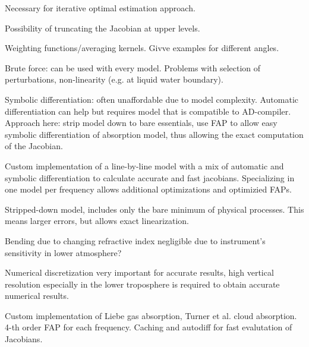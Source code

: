 \stopsection


\startsection[title=Linearization]

    Necessary for iterative optimal estimation approach.

    Possibility of truncating the Jacobian at upper levels.

    \startsubsection[title=Weighting Functions]

        Weighting functions/averaging kernels. Givve examples for different
        angles.

    \stopsubsection

    \startsubsection[title=Calculating the Jacobian]

        Brute force: can be used with every model. Problems with selection of
        perturbations, non-linearity (e.g. at liquid water boundary).

        Symbolic differentiation: often unaffordable due to model complexity.
        Automatic differentiation can help but requires model that is
        compatible to AD-compiler. Approach here: strip model down to bare
        essentials, use FAP to allow easy symbolic differentiation of
        absorption model, thus allowing the exact computation of the Jacobian.
        
    \stopsubsection

\stopsection


\startsection[title=A Numerical Model]

    Custom implementation of a line-by-line model with a mix of automatic and
    symbolic differentiation to calculate accurate and fast jacobians.
    Specializing in one model per frequency allows additional optimizations
    and optimizied FAPs.

    Stripped-down model, includes only the bare minimum of physical processes.
    This means larger errors, but allows exact linearization.

    Bending due to changing refractive index negligible due to instrument's
    sensitivity in lower atmosphere?

    Numerical discretization very important for accurate results, high vertical
    resolution especially in the lower troposphere is required to obtain
    accurate numerical results.

    \startsubsection[title=Implementation]

        Custom implementation of Liebe gas absorption, Turner et al. cloud
        absorption. 4-th order FAP for each frequency. Caching and autodiff
        for fast evalutation of Jacobians.


